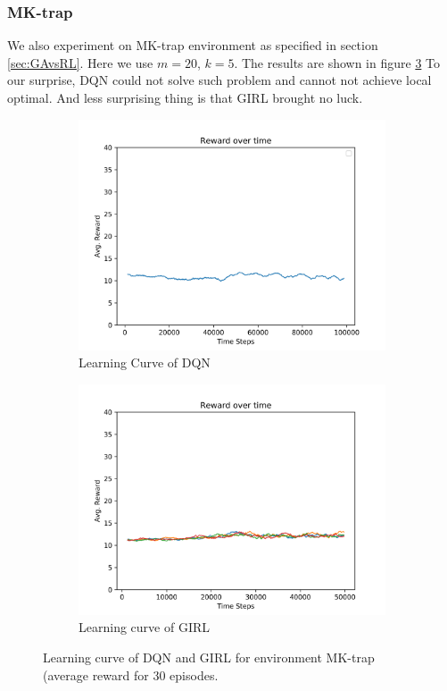 \documentclass[a4paper]{article}
\begin{document}
\subsubsection*{MK-trap}

We also experiment on MK-trap environment as specified in section \ref{sec:GAvsRL}. Here we use $m=20$, $k=5$. The results are shown in figure \ref{fig:learning-curve-dqn-grl-mktrap} To our surprise, DQN could not solve such problem and cannot not achieve local optimal. And less surprising thing is that GIRL brought no luck.

\begin{figure}[H]
\centering
\begin{subfigure}{.45\textwidth}
  \includegraphics[width=\linewidth]{figures/dqn-mktrap.png}
  \caption{Learning Curve of DQN}
  \label{fig:learning-curve-dqn-mktrap}
\end{subfigure}
\begin{subfigure}{.45\textwidth}
  \includegraphics[width=\linewidth]{figures/grl-mktrap.png}
  \caption{Learning curve of GIRL}
  \label{fig:learning-curve-girl-mktrap}
\end{subfigure}
\caption{Learning curve of DQN and GIRL for environment MK-trap (average reward for 30 episodes.}
\label{fig:learning-curve-dqn-grl-mktrap}
\end{figure}
\end{document}
